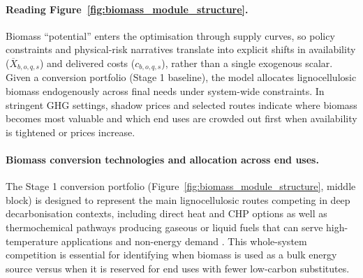 \documentclass{article}
\begin{document}
\paragraph{Reading Figure~\ref{fig:biomass_module_structure}.}
Biomass ``potential'' enters the optimisation through supply curves, so policy constraints and physical-risk narratives translate into explicit shifts in availability (\(\overline{X}_{b,o,q,s}\)) and delivered costs (\(c_{b,o,q,s}\)), rather than a single exogenous scalar. Given a conversion portfolio (Stage 1 baseline), the model allocates lignocellulosic biomass endogenously across final needs under system-wide constraints. In stringent GHG settings, shadow prices and selected routes indicate where biomass becomes most valuable and which end uses are crowded out first when availability is tightened or prices increase.

\paragraph{Biomass conversion technologies and allocation across end uses.}
The Stage 1 conversion portfolio (Figure~\ref{fig:biomass_module_structure}, middle block) is designed to represent the main lignocellulosic routes competing in deep decarbonisation contexts, including direct heat and CHP options as well as thermochemical pathways producing gaseous or liquid fuels that can serve high-temperature applications and non-energy demand \citep{colla_optimal_2022}. This whole-system competition is essential for identifying when biomass is used as a bulk energy source versus when it is reserved for end uses with fewer low-carbon substitutes.
\end{document}
